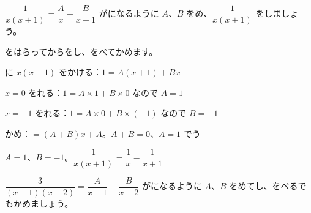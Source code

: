 \begin{reidai}[\R{部分分数分解}{ぶ|ぶん|ぶん|すう|ぶん|かい}]
$\dfrac{1}{x(x+1)}=\dfrac{A}{x}+\dfrac{B}{x+1}$ がになるように $A$、$B$ をめ、$\dfrac{1}{x(x+1)}$ をしましょう。\par
\kangaekata {}をはらってからをし、をべてかめます。\par
\shiki {}に $x(x+1)$ をかける：$1=A(x+1)+Bx$\par
\hspace*{2.6\zw}$x=0$ をれる：$1=A\times1+B\times0$ なので $A=1$\par
\hspace*{2.6\zw}$x=-1$ をれる：$1=A\times0+B\times(-1)$ なので $B=-1$\par
\hspace*{2.6\zw}かめ：$=(A+B)x+A$。$A+B=0$、$A=1$ でう\par
\kotae $A=1$、$B=-1$。\quad $\dfrac{1}{x(x+1)}=\dfrac{1}{x}-\dfrac{1}{x+1}$
\end{reidai}

\begin{jibun}
$\dfrac{3}{(x-1)(x+2)}=\dfrac{A}{x-1}+\dfrac{B}{x+2}$ がになるように $A$、$B$ をめてし、をべるでもかめましょう。
\end{jibun}

